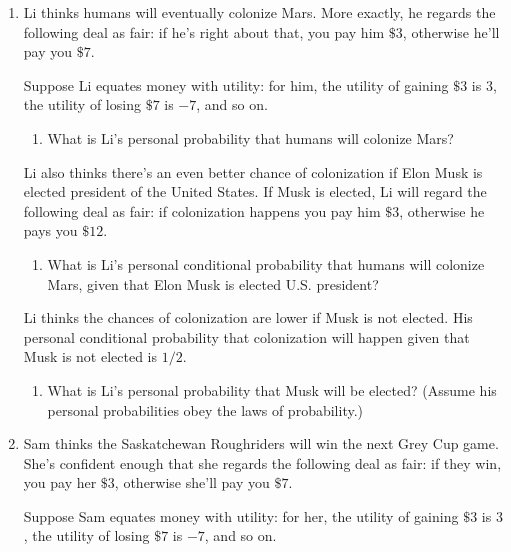 \documentclass[justified]{tufte-book}
\providecommand{\tightlist}{%
  \setlength{\itemsep}{0pt}\setlength{\parskip}{0pt}}
\theoremstyle{definition}
\theoremstyle{definition}
\theoremstyle{definition}
\theoremstyle{remark}
\begin{document}
\begin{enumerate}
\item
  Li thinks humans will eventually colonize Mars. More exactly, he regards the following deal as fair: if he's right about that, you pay him \(\$3\), otherwise he'll pay you \(\$7\).

  Suppose Li equates money with utility: for him, the utility of gaining \(\$3\) is \(3\), the utility of losing \(\$7\) is \(-7\), and so on.

  \begin{enumerate}
  \def\labelenumii{\alph{enumii}.}
  \tightlist
  \item
    What is Li's personal probability that humans will colonize Mars?
  \end{enumerate}

  Li also thinks there's an even better chance of colonization if Elon Musk is elected president of the United States. If Musk is elected, Li will regard the following deal as fair: if colonization happens you pay him \(\$3\), otherwise he pays you \(\$12\).

  \begin{enumerate}
  \def\labelenumii{\alph{enumii}.}
  \setcounter{enumii}{1}
  \tightlist
  \item
    What is Li's personal conditional probability that humans will colonize Mars, given that Elon Musk is elected U.S. president?
  \end{enumerate}

  Li thinks the chances of colonization are lower if Musk is not elected. His personal conditional probability that colonization will happen given that Musk is not elected is \(1/2\).

  \begin{enumerate}
  \def\labelenumii{\alph{enumii}.}
  \setcounter{enumii}{2}
  \tightlist
  \item
    What is Li's personal probability that Musk will be elected? (Assume his personal probabilities obey the laws of probability.)
  \end{enumerate}
\item
  Sam thinks the Saskatchewan Roughriders will win the next Grey Cup game. She's confident enough that she regards the following deal as fair: if they win, you pay her \(\$3\), otherwise she'll pay you \(\$7\).

  Suppose Sam equates money with utility: for her, the utility of gaining \(\$3\) is \(3\), the utility of losing \(\$7\) is \(-7\), and so on.


\end{enumerate}
\end{document}
